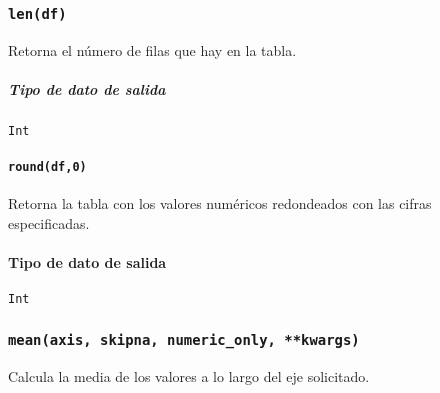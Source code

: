         \subsubsection{\texttt{len(df)}} Retorna el número de filas que hay en la tabla.
        \subparagraph{Tipo de dato de salida} \texttt{Int}


        \paragraph{\texttt{round(df,0)}} Retorna la tabla con los valores numéricos redondeados con las cifras especificadas.
        \paragraph{Tipo de dato de salida} \texttt{Int}


        \subsubsection{\texttt{mean(axis, skipna, numeric\_only, **kwargs)}} Calcula la media de los valores a lo largo del eje solicitado.

